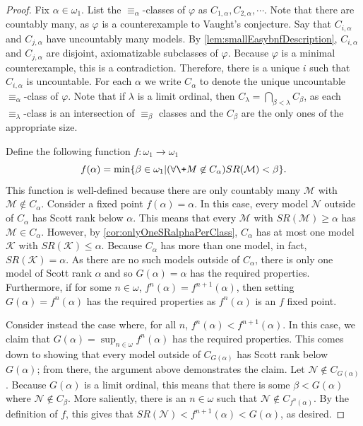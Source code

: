 \documentclass{amsart}
\renewcommand{\-}{\text{-}}
\begin{document}
\begin{proof}
Fix $\alpha\in\omega_1$.
List the $\equiv_\alpha$-classes of $\varphi$ as $C_{1,\alpha},C_{2,\alpha},\cdots$.
Note that there are countably many, as $\varphi$ is a counterexample to Vaught's conjecture.
Say that $C_{i,\alpha}$ and $C_{j,\alpha}$ have uncountably many models.
By \cref{lem:smallEasybnfDescription}, $C_{i,\alpha}$ and $C_{j,\alpha}$ are disjoint, axiomatizable subclasses of $\varphi$.
Because $\varphi$ is a minimal counterexample, this is a contradiction.
Therefore, there is a unique $i$ such that $C_{i,\alpha}$ is uncountable.
For each $\alpha$ we write $C_\alpha$ to denote the unique uncountable $\equiv_\alpha$-class of $\varphi$.
Note that if $\lambda$ is a limit ordinal, then $C_\lambda = \bigcap_{\beta<\lambda} C_\beta$, as each $\equiv_\lambda$-class is an intersection of $\equiv_\beta$ classes and the $C_\beta$ are the only ones of the appropriate size.

Define the following function $f:\omega_1\to\omega_1$
\[f(\alpha)=\min\{ \beta\in\omega_1 | (\forall \+M\not\in C_\alpha) SR(\mathcal{M})<\beta\}. \]
This function is well-defined because there are only countably many $\mathcal{M}$ with $\mathcal{M}\not\in C_\alpha$.
Consider a fixed point $f(\alpha)=\alpha$.
In this case, every model $\mathcal{N}$ outside of $C_\alpha$ has Scott rank below $\alpha$.
This means that every $\mathcal{M}$ with $SR(\mathcal{M})\geq\alpha$ has $\mathcal{M}\in C_\alpha$.
However, by \cref{cor:onlyOneSRalphaPerClass}, $C_\alpha$ has at most one model $\mathcal{K}$ with $SR(\mathcal{K})\leq\alpha$.
Because $C_\alpha$ has more than one model, in fact, $SR(\mathcal{K})=\alpha$.
As there are no such models outside of $C_\alpha$, there is only one model of Scott rank $\alpha$ and so $G(\alpha)=\alpha$ has the required properties.
Furthermore, if for some $n\in\omega$, $f^n(\alpha)=f^{n+1}(\alpha)$, then setting $G(\alpha)=f^n(\alpha)$ has the required properties as $f^n(\alpha)$ is an $f$ fixed point.

Consider instead the case where, for all $n$, $f^n(\alpha)<f^{n+1}(\alpha)$.
In this case, we claim that $G(\alpha)=\sup_{n\in\omega} f^n(\alpha)$ has the required properties.
This comes down to showing that every model outside of $C_{G(\alpha)}$ has Scott rank below $G(\alpha)$; from there, the argument above demonstrates the claim.
Let $\mathcal{N}\not\in C_{G(\alpha)}$.
Because $G(\alpha)$ is a limit ordinal, this means that there is some $\beta<G(\alpha)$ where $\mathcal{N}\not\in C_\beta$.
More saliently, there is an $n\in\omega$ such that $\mathcal{N}\not\in C_{f^n(\alpha)}$.
By the definition of $f$, this gives that $SR(\mathcal{N})<f^{n+1}(\alpha)<G(\alpha)$, as desired.
\end{proof}
\end{document}
